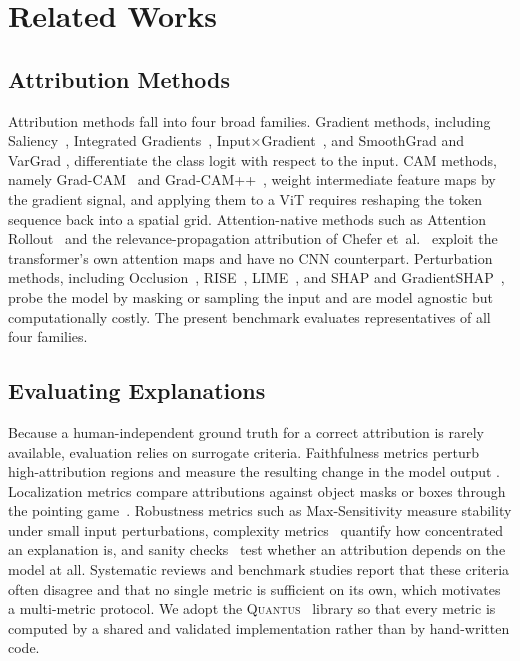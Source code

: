 \documentclass[lettersize,journal]{IEEEtran}
\begin{document}
\section{Related Works}
\label{sec:related}

\subsection{Attribution Methods}
Attribution methods fall into four broad families. Gradient methods, including
Saliency~\cite{simonyan2014saliency}, Integrated
Gradients~\cite{sundararajan2017ig},
Input$\times$Gradient~\cite{shrikumar2017deeplift}, and SmoothGrad and VarGrad
\cite{smilkov2017smoothgrad}, differentiate the class logit with respect to the
input. CAM methods, namely Grad-CAM~\cite{selvaraju2017gradcam} and
Grad-CAM++~\cite{chattopadhay2018gradcampp}, weight intermediate feature maps by
the gradient signal, and applying them to a ViT requires reshaping the token
sequence back into a spatial grid. Attention-native methods such as Attention
Rollout~\cite{abnar2020rollout} and the relevance-propagation attribution of
Chefer et~al.~\cite{chefer2021transformer,bach2015lrp} exploit the transformer's
own attention maps and have no CNN counterpart. Perturbation methods, including
Occlusion~\cite{zeiler2014occlusion}, RISE~\cite{petsiuk2018rise},
LIME~\cite{ribeiro2016lime}, and SHAP and GradientSHAP~\cite{lundberg2017shap},
probe the model by masking or sampling the input and are model agnostic but
computationally costly. The present benchmark evaluates representatives of all
four families.

\subsection{Evaluating Explanations}
Because a human-independent ground truth for a correct attribution is rarely
available, evaluation relies on surrogate criteria. Faithfulness metrics perturb
high-attribution regions and measure the resulting change in the model output
\cite{bhatt2020faithfulness,alvarez2018robustness,rong2022road}. Localization
metrics compare attributions against object masks or boxes through the pointing
game~\cite{zhang2018pointing}. Robustness metrics such as Max-Sensitivity
\cite{yeh2019sensitivity} measure stability under small input perturbations,
complexity metrics~\cite{chalasani2020sparseness} quantify how concentrated an
explanation is, and sanity checks~\cite{adebayo2018sanity} test whether an
attribution depends on the model at all. Systematic reviews and benchmark studies
\cite{nauta2023anecdotal,bodria2023benchmarking} report that these criteria
often disagree and that no single metric is sufficient on its own, which
motivates a multi-metric protocol. We adopt the
\textsc{Quantus}~\cite{hedstrom2023quantus} library so that every metric is
computed by a shared and validated implementation rather than by hand-written
code.
\end{document}
